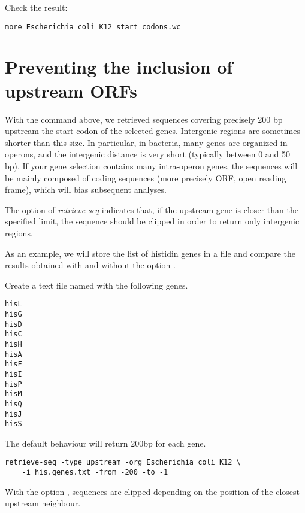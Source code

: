 Check the result:

{\color{blue} \begin{footnotesize}
\begin{verbatim}
more Escherichia_coli_K12_start_codons.wc
\end{verbatim} \end{footnotesize}
}

\section{Preventing the inclusion of upstream ORFs}

With the command above, we retrieved sequences covering precisely 200
bp upstream the start codon of the selected genes. Intergenic regions
are sometimes shorter than this size. In particular, in bacteria, many
genes are organized in operons, and the intergenic distance is very
short (typically between 0 and 50 bp). If your gene selection contains
many intra-operon genes, the sequences will be mainly composed of
coding sequences (more precisely ORF, open reading frame), which will
bias subsequent analyses.

The option  of \textit{retrieve-seq} indicates that, if
the upstream gene is closer than the specified limit, the sequence
should be clipped in order to return only intergenic regions.

As an example, we will store the list of histidin genes in a file and
compare the results obtained with and without the option
.

Create a text file named  with the following
genes.

{\color{blue} \begin{footnotesize}
\begin{verbatim}
hisL
hisG
hisD
hisC
hisH
hisA
hisF
hisI
hisP
hisM
hisQ
hisJ
hisS
\end{verbatim} \end{footnotesize}
}

The default behaviour will return 200bp for each gene. 

{\color{blue} \begin{footnotesize}
\begin{verbatim}
retrieve-seq -type upstream -org Escherichia_coli_K12 \
    -i his.genes.txt -from -200 -to -1
\end{verbatim} \end{footnotesize}
}

With the option , sequences are clipped depending on
the position of the closest upstream neighbour.

